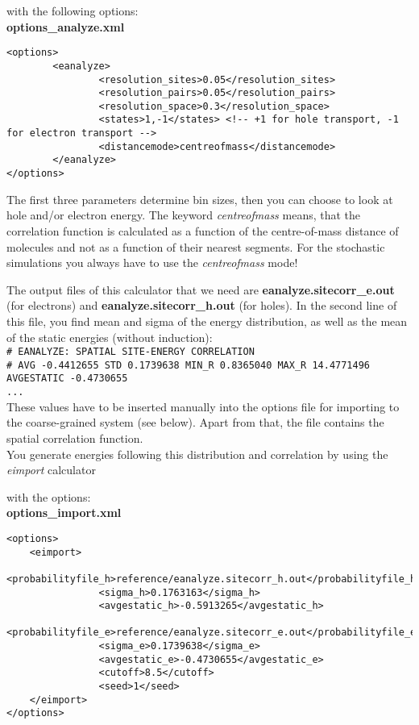 with the following options:
\\

\textbf{options\_analyze.xml}

\lstset{language=XML}
\begin{lstlisting}
<options>
        <eanalyze>
                <resolution_sites>0.05</resolution_sites>
                <resolution_pairs>0.05</resolution_pairs>
                <resolution_space>0.3</resolution_space>
                <states>1,-1</states> <!-- +1 for hole transport, -1 for electron transport -->
                <distancemode>centreofmass</distancemode>
        </eanalyze>
</options>
\end{lstlisting}

The first three parameters determine bin sizes, then you can choose to look at hole and/or electron energy. The keyword \emph{centreofmass} means, that the correlation function is calculated as a function of the centre-of-mass distance of molecules and not as a function of their nearest segments. For the stochastic simulations you always have to use the \emph{centreofmass} mode!

The output files of this calculator that we need are \textbf{eanalyze.sitecorr\_e.out} (for electrons) and \textbf{eanalyze.sitecorr\_h.out} (for holes). In the second line of this file, you find mean and sigma of the energy distribution, as well as the mean of the static energies (without induction):
\\

\texttt{\# EANALYZE: SPATIAL SITE-ENERGY CORRELATION\\
\# AVG -0.4412655 STD 0.1739638 MIN\_R 0.8365040 MAX\_R 14.4771496  AVGESTATIC -0.4730655\\
...}
\\
These values have to be inserted manually into the options file for importing to the coarse-grained system (see below). Apart from that, the file contains the spatial correlation function.\\

You generate energies following this distribution and correlation by using the \emph{eimport} calculator


with the options:\\

\textbf{options\_import.xml}

\lstset{language=XML}
\begin{lstlisting}
<options>
	<eimport>
                <probabilityfile_h>reference/eanalyze.sitecorr_h.out</probabilityfile_h>
                <sigma_h>0.1763163</sigma_h>
                <avgestatic_h>-0.5913265</avgestatic_h>
                <probabilityfile_e>reference/eanalyze.sitecorr_e.out</probabilityfile_e>
                <sigma_e>0.1739638</sigma_e>
                <avgestatic_e>-0.4730655</avgestatic_e>
                <cutoff>8.5</cutoff>
                <seed>1</seed>
	</eimport>
</options>
\end{lstlisting}


